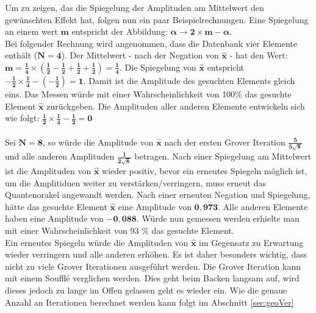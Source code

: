 \noindent
Um zu zeigen, das die Spiegelung der Amplituden am Mittelwert den gewünschten Effekt hat, folgen nun ein paar Beispielrechnungen. Eine Spiegelung an einem wert $\mathbf{m}$ entspricht der Abbildung: $\mathbf{\alpha \rightarrow 2 \times m - \alpha}$. \\
Bei folgender Rechnung wird angenommen, dass die Datenbank vier Elemente enthält ($\mathbf{N=4}$). Der Mittelwert - nach der Negation von $\mathbf{\hat x}$ - hat den Wert: $\mathbf{m = \frac{1}{4} \times (\frac{1}{2}- \frac{1}{2}+ \frac{1}{2} +\frac{1}{2}) = \frac{1}{4}}$. Die Spiegelung von $\mathbf{\hat x}$ entspricht $\mathbf{-\frac{1}{2} \times \frac{1}{4} - (-\frac{1}{2}) = 1}$. Damit ist die Amplitude des gesuchten Elements gleich eins. Das Messen würde mit einer Wahrscheinlichkeit von 100\%  das gesuchte Element $\mathbf{\hat x}$ zurückgeben. Die Amplituden aller anderen Elemente entwickeln sich wie folgt: $\mathbf{\frac{1}{2} \times \frac{1}{4} - \frac{1}{2} = 0}$
\\ \\
Sei $\mathbf{N = 8}$, so würde die Amplitude von $\mathbf{ \hat x}$ nach der ersten Grover Iteration $\mathbf{\frac{5}{5\sqrt 8}}$ und alle anderen Amplituden $\mathbf{\frac{1}{2\sqrt 8}}$ betragen. Nach einer Spiegelung am Mittelwert ist die Amplituden von $\mathbf{\hat x}$ wieder positiv, bevor ein erneutes Spiegeln möglich ist, um die Amplitiduen weiter zu verstärken/verringern, muss erneut das Quantenorakel angewandt werden. Nach einer erneuten Negation und Spiegelung, hätte das gesuchte Element $\mathbf{\hat x}$ eine Amplitude von $\mathbf{0,973}$. Alle anderen Elemente haben eine Amplitude von $\mathbf{-0, 088}$. Würde nun gemessen werden erhielte man mit einer Wahrscheinlichkeit von 93 \% das gesuchte Element.
\\ 
Ein erneutes Spiegeln würde die Amplituden von $\mathbf{\hat{x}}$ im Gegensatz zu Erwartung wieder verringern und alle anderen erhöhen. Es ist daher besonders wichtig, dass nicht zu viele Grover Iterationen ausgeführt werden. Die Grover Iteration kann mit einem Souffl\'{e} verglichen werden. Dies geht beim Backen langsam auf, wird dieses jedoch zu lange im Offen gelassen geht es wieder ein. Wie die genaue Anzahl an Iterationen berechnet werden kann folgt im Abschnitt \ref{sec:geoVer}

